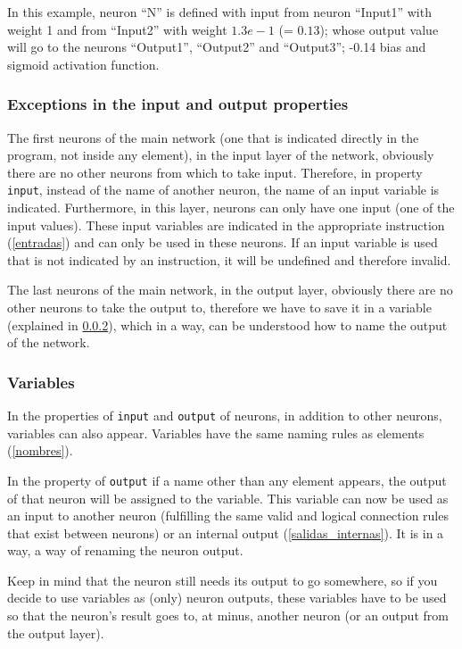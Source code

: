 \documentclass[a4paper]{article}
\begin{document}
In this example, neuron ``N'' is defined with input from neuron ``Input1'' with weight 1 and from ``Input2'' with weight $1.3e-1$ (= $0.13$); whose output value will go to the neurons ``Output1'', ``Output2'' and ``Output3''; -0.14 bias and sigmoid activation function.

\subsubsection{Exceptions in the input and output properties}
The first neurons of the main network (one that is indicated directly in the program, not inside any element), in the input layer of the network, obviously there are no other neurons from which to take input. Therefore, in property \texttt{input}, instead of the name of another neuron, the name of an input variable is indicated. Furthermore, in this layer, neurons can only have one input (one of the input values). These input variables are indicated in the appropriate instruction (\ref{entradas}) and can only be used in these neurons. If an input variable is used that is not indicated by an instruction, it will be undefined and therefore invalid.

The last neurons of the main network, in the output layer, obviously there are no other neurons to take the output to, therefore we have to save it in a variable (explained in \ref{variables}), which in a way, can be understood how to name the output of the network.

\subsubsection{Variables} \label{variables}
In the properties of \texttt{input} and \texttt{output} of neurons, in addition to other neurons, variables can also appear. Variables have the same naming rules as elements (\ref{nombres}).

In the property of \texttt{output} if a name other than any element appears, the output of that neuron will be assigned to the variable. This variable can now be used as an input to another neuron (fulfilling the same valid and logical connection rules that exist between neurons) or an internal output (\ref{salidas_internas}). It is in a way, a way of renaming the neuron output.

Keep in mind that the neuron still needs its output to go somewhere, so if you decide to use variables as (only) neuron outputs, these variables have to be used so that the neuron's result goes to, at minus, another neuron (or an output from the output layer).
\end{document}
